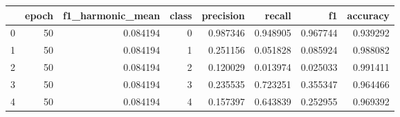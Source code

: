 \begin{tabular}{lrrrrrrr}
\toprule
 & epoch & f1_harmonic_mean & class & precision & recall & f1 & accuracy \\
\midrule
0 & 50 & 0.084194 & 0 & 0.987346 & 0.948905 & 0.967744 & 0.939292 \\
1 & 50 & 0.084194 & 1 & 0.251156 & 0.051828 & 0.085924 & 0.988082 \\
2 & 50 & 0.084194 & 2 & 0.120029 & 0.013974 & 0.025033 & 0.991411 \\
3 & 50 & 0.084194 & 3 & 0.235535 & 0.723251 & 0.355347 & 0.964466 \\
4 & 50 & 0.084194 & 4 & 0.157397 & 0.643839 & 0.252955 & 0.969392 \\
\bottomrule
\end{tabular}
